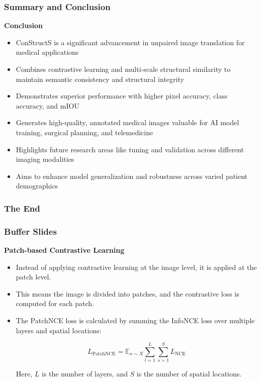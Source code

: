 \documentclass[aspectratio=169, lecture, amberg]{OTHAWbeamer}
\begin{document}
\begin{frame}
    \frametitle{Summary and Conclusion}
    \textbf{Conclusion}
    \begin{itemize}
        \item <1-> ConStructS is a significant advancement in unpaired image translation for medical applications
        \item <2-> Combines contrastive learning and multi-scale structural similarity to maintain semantic consistency and structural integrity
        \item <3-> Demonstrates superior performance with higher pixel accuracy, class accuracy, and mIOU
        \item <4-> Generates high-quality, annotated medical images valuable for AI model training, surgical planning, and telemedicine
        \item <5-> Highlights future research areas like tuning and validation across different imaging modalities
        \item <6-> Aims to enhance model generalization and robustness across varied patient demographics
    \end{itemize}
\end{frame}


\begin{frame}
\frametitle{The End}
\begin{center}
\end{center}
\end{frame}

\begin{frame}
    \frametitle{Buffer Slides}
    \textbf{Patch-based Contrastive Learning}
    \begin{itemize}
        \item Instead of applying contrastive learning at the image level, it is applied at the patch level.
        \item This means the image is divided into patches, and the contrastive loss is computed for each patch.
        \item The PatchNCE loss is calculated by summing the InfoNCE loss over multiple layers and spatial locations:
        \begin{block}{}
            \[
            L_{\text{PatchNCE}} = \mathbb{E}_{x \sim X} \sum_{l=1}^{L} \sum_{s=1}^{S} L_{\text{NCE}}
            \]
        \end{block}
        Here, $L$ is the number of layers, and $S$ is the number of spatial locations.
    \end{itemize}
    
\end{frame}
\end{document}
